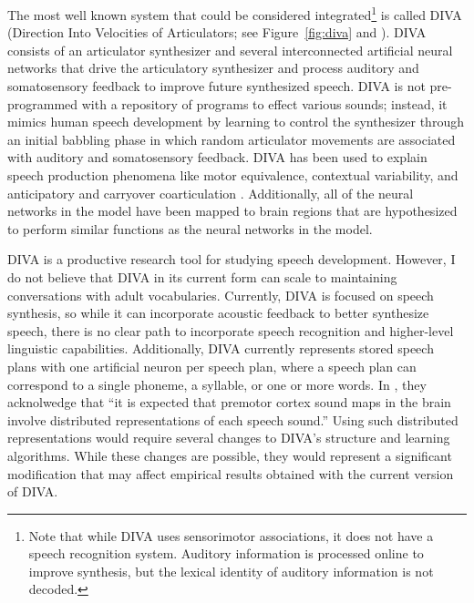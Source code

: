 The most well known system
that could be considered integrated\footnote{
  Note that while DIVA uses sensorimotor associations,
  it does not have a speech recognition system.
  Auditory information is processed online
  to improve synthesis,
  but the lexical identity of auditory information
  is not decoded.}
is called DIVA
(Direction Into Velocities of Articulators;
see Figure~\ref{fig:diva} and
\citealt{guenther1995,guenther2004,guenther2006,guenther2006a}).
DIVA consists of an articulator synthesizer
and several interconnected artificial neural networks
that drive the articulatory synthesizer
and process auditory and somatosensory feedback
to improve future synthesized speech.
DIVA is not pre-programmed with a repository
of programs to effect various sounds;
instead, it mimics human speech development
by learning to control the synthesizer
through an initial babbling phase
in which random articulator movements
are associated with auditory
and somatosensory feedback.
DIVA has been used to explain
speech production phenomena
like motor equivalence, contextual variability,
and anticipatory and carryover coarticulation
\citep{guenther1995,guenther2003,nieto2005}.
Additionally, all of the neural networks
in the model have been mapped
to brain regions that are hypothesized
to perform similar functions
as the neural networks in the model.


DIVA is a productive research tool
for studying speech development.
However, I do not believe that DIVA
in its current form
can scale to maintaining conversations
with adult vocabularies.
Currently, DIVA is focused on speech synthesis,
so while it can incorporate acoustic feedback
to better synthesize speech,
there is no clear path
to incorporate speech recognition
and higher-level linguistic capabilities.
Additionally, DIVA currently represents
stored speech plans with one artificial
neuron per speech plan,
where a speech plan can correspond to
a single phoneme, a syllable, or one or more words.
In \citet{guenther2006a},
they acknolwedge that ``it is expected that
premotor cortex sound maps in the brain
involve distributed representations
of each speech sound.''
Using such distributed representations
would require several changes to DIVA's
structure and learning algorithms.
While these changes are possible,
they would represent a significant
modification that may affect
empirical results obtained
with the current version of DIVA.

